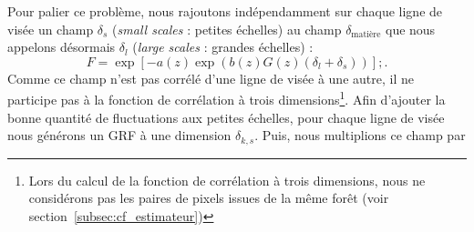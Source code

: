 {%
Pour palier ce problème, nous rajoutons indépendamment sur chaque ligne de visée un champ $\delta_s$ (\emph{small scales} : petites échelles) au champ $\delta_{\mathrm{matière}}$ que nous appelons désormais $\delta_{l}$ (\emph{large scales} : grandes échelles) :}
\begin{equation}
  \label{eq:fgpa3}
  F = \exp\left[ - a(z) \exp(b(z) G(z) (\delta_l + \delta_s))\right] ;.
\end{equation}
Comme ce champ n'est pas corrélé d'une ligne de visée à une autre, il ne participe pas à la fonction de corrélation à trois dimensions\footnote{Lors du calcul de la fonction de corrélation à trois dimensions, nous ne considérons pas les paires de pixels issues de la même forêt (voir section~\ref{subsec:cf_estimateur})}.
Afin d'ajouter la bonne quantité de fluctuations aux petites échelles, pour chaque ligne de visée nous générons un GRF à une dimension $\delta_{k,s}$.
Puis, nous multiplions ce champ par
